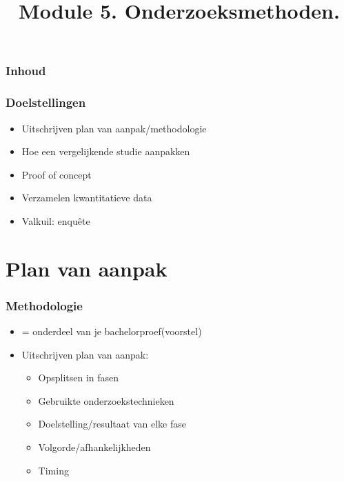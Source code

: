 \documentclass[aspectratio=169]{beamer}
\title{Module 5. Onderzoeksmethoden.}
\subtitle{\coursename}
\author{\lecturers}   %
\date{\academicyear}
\begin{document}
\begin{frame}
  \maketitle
\end{frame}

\begin{frame}
  \frametitle{Inhoud}

  \tableofcontents
\end{frame}

\begin{frame}
  \frametitle{Doelstellingen}

  \begin{itemize}
    \item Uitschrijven plan van aanpak/methodologie
    \item Hoe een vergelijkende studie aanpakken
    \item Proof of concept
    \item Verzamelen kwantitatieve data
    \item Valkuil: enquête
  \end{itemize}

\end{frame}

\section{Plan van aanpak}

\begin{frame}
  \frametitle{Methodologie}

  \begin{itemize}
    \item = onderdeel van je bachelorproef(voorstel)
    \item Uitschrijven plan van aanpak:
          \begin{itemize}
            \item Opsplitsen in fasen
            \item Gebruikte onderzoekstechnieken
            \item Doelstelling/resultaat van elke fase
            \item Volgorde/afhankelijkheden
            \item Timing
          \end{itemize}
  \end{itemize}


\end{frame}
\end{document}
